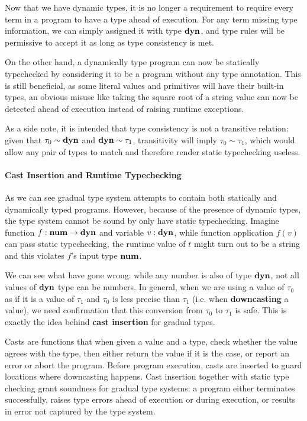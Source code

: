Now that we have dynamic types, it is no longer a requirement to require
every term in a program to have a type ahead of execution.
For any term missing type information, we can simply assigned it with type $\textbf{dyn}$,
and type rules will be permissive to accept it as long as type consistency is met.

On the other hand, a dynamically type program can now be statically typechecked
by considering it to be a program without any type annotation.
This is still beneficial, as some literal values and primitives will have their built-in types,
an obvious misuse like taking the square root of a string value can now be detected ahead of execution
instead of raising runtime exceptions.

As a side note, it is intended that type consistency is not a transitive relation: given that $\tau_0 \sim \textbf{dyn}$ and $\textbf{dyn} \sim \tau_1$, transitivity will imply $\tau_0 \sim \tau_1$, which would
allow any pair of types to match and therefore render static typechecking useless.

\paragraph{Cast Insertion and Runtime Typechecking}

As we can see gradual type system attempts to contain both statically and dynamically typed programs.
However, because of the presence of dynamic types,
the type system cannot be sound by only have static typechecking.
Imagine function $f : \textbf{num} \rightarrow \textbf{dyn}$ and variable $v : \textbf{dyn}$, while function application
$f(v)$ can pass static typechecking, the runtime value of $t$ might turn out to be a string
and this violates $f$'s input type $\textbf{num}$.

We can see what have gone wrong: while any number is also of type $\textbf{dyn}$,
not all values of $\textbf{dyn}$ type can be numbers.
In general, when we are using a value of $\tau_0$ as if it is a value of $\tau_1$ and
$\tau_0$ is less precise than $\tau_1$
(i.e. when \textbf{downcasting} a value), we need confirmation that this conversion
from $\tau_0$ to $\tau_1$ is safe. This is exactly the idea
behind \textbf{cast insertion} for gradual types.

Casts are functions that when given a value and a type, check whether the value
agrees with the type, then either return the value if it is the case, or report an error
or abort the program.
Before program execution, casts are inserted to guard locations where downcasting happens.
Cast insertion together with static type checking grant soundness for gradual type systems:
a program either terminates successfully, raises type errors ahead of execution or during execution, or
results in error not captured by the type system.

